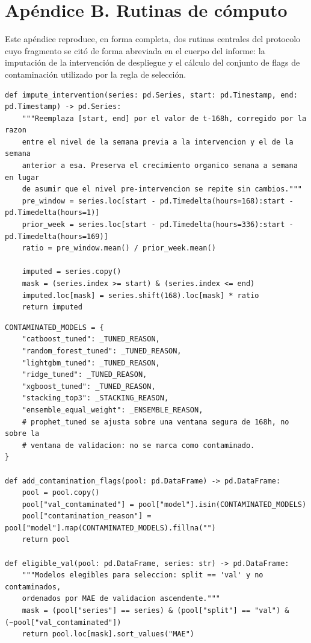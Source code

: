 \section{Apéndice B. Rutinas de cómputo}

Este apéndice reproduce, en forma completa, dos rutinas centrales del protocolo cuyo fragmento se citó de
forma abreviada en el cuerpo del informe: la imputación de la intervención de despliegue y el cálculo del
conjunto de flags de contaminación utilizado por la regla de selección.

\begin{lstlisting}[caption={Imputación de la ventana de intervención mediante el valor de la semana anterior corregido por nivel (\texttt{tsa\_final/data.py}).}]
def impute_intervention(series: pd.Series, start: pd.Timestamp, end: pd.Timestamp) -> pd.Series:
    """Reemplaza [start, end] por el valor de t-168h, corregido por la razon
    entre el nivel de la semana previa a la intervencion y el de la semana
    anterior a esa. Preserva el crecimiento organico semana a semana en lugar
    de asumir que el nivel pre-intervencion se repite sin cambios."""
    pre_window = series.loc[start - pd.Timedelta(hours=168):start - pd.Timedelta(hours=1)]
    prior_week = series.loc[start - pd.Timedelta(hours=336):start - pd.Timedelta(hours=169)]
    ratio = pre_window.mean() / prior_week.mean()

    imputed = series.copy()
    mask = (series.index >= start) & (series.index <= end)
    imputed.loc[mask] = series.shift(168).loc[mask] * ratio
    return imputed
\end{lstlisting}

\begin{lstlisting}[caption={Marcado de modelos con puntaje de validación contaminado (\texttt{tsa\_final/selection.py}).}]
CONTAMINATED_MODELS = {
    "catboost_tuned": _TUNED_REASON,
    "random_forest_tuned": _TUNED_REASON,
    "lightgbm_tuned": _TUNED_REASON,
    "ridge_tuned": _TUNED_REASON,
    "xgboost_tuned": _TUNED_REASON,
    "stacking_top3": _STACKING_REASON,
    "ensemble_equal_weight": _ENSEMBLE_REASON,
    # prophet_tuned se ajusta sobre una ventana segura de 168h, no sobre la
    # ventana de validacion: no se marca como contaminado.
}

def add_contamination_flags(pool: pd.DataFrame) -> pd.DataFrame:
    pool = pool.copy()
    pool["val_contaminated"] = pool["model"].isin(CONTAMINATED_MODELS)
    pool["contamination_reason"] = pool["model"].map(CONTAMINATED_MODELS).fillna("")
    return pool

def eligible_val(pool: pd.DataFrame, series: str) -> pd.DataFrame:
    """Modelos elegibles para seleccion: split == 'val' y no contaminados,
    ordenados por MAE de validacion ascendente."""
    mask = (pool["series"] == series) & (pool["split"] == "val") & (~pool["val_contaminated"])
    return pool.loc[mask].sort_values("MAE")
\end{lstlisting}

